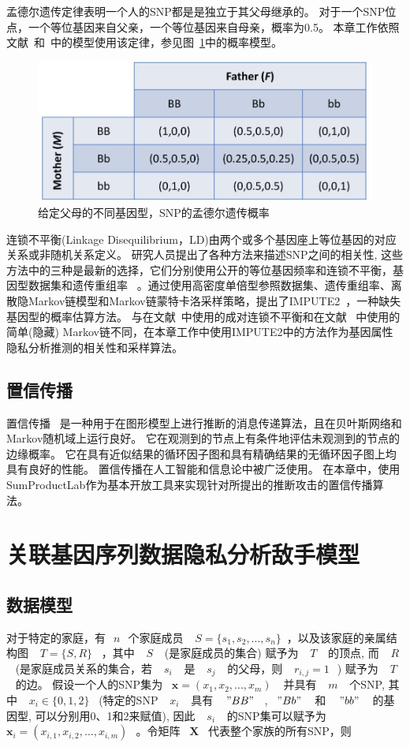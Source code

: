 孟德尔遗传定律表明一个人的SNP都是是独立于其父母继承的。 对于一个SNP位点，一个等位基因来自父亲，一个等位基因来自母亲，概率为0.5。 本章工作依照文献~\cite{humbert2013addressing}和~\cite{deznabi2018inference}中的模型使用该定律，参见图~\ref{fig:Mendelian-law}中的概率模型。

\begin{figure}[htbp]
	\centering
	\includegraphics[width=0.6\linewidth]{./figures/Mendelian-law.jpg}
	\centering
	\caption{给定父母的不同基因型，SNP的孟德尔遗传概率}\label{fig:Mendelian-law}
\end{figure}

连锁不平衡(Linkage Disequilibrium，LD)由两个或多个基因座上等位基因的对应关系或非随机关系定义。 研究人员提出了各种方法来描述SNP之间的相关性, 这些方法中的三种是最新的选择，它们分别使用公开的等位基因频率和连锁不平衡，基因型数据集和遗传重组率~\cite{samani2015quantifying} 。通过使用高密度单倍型参照数据集、遗传重组率、离散隐Markov链模型和Markov链蒙特卡洛采样策略，提出了IMPUTE2~\cite{howie2014impute2}，一种缺失基因型的概率估算方法。 与在文献~\cite{humbert2013addressing,humbert2017quantifying}中使用的成对连锁不平衡和在文献~\cite{deznabi2018inference} 中使用的简单(隐藏) Markov链不同，在本章工作中使用IMPUTE2中的方法作为基因属性隐私分析推测的相关性和采样算法。

\subsection{置信传播}

置信传播~\cite{kschischang2001factor} 是一种用于在图形模型上进行推断的消息传递算法，且在贝叶斯网络和Markov随机域上运行良好。 它在观测到的节点上有条件地评估未观测到的节点的边缘概率。 它在具有近似结果的循环因子图和具有精确结果的无循环因子图上均具有良好的性能。 置信传播在人工智能和信息论中被广泛使用。 在本章中，使用 SumProductLab作为基本开放工具来实现针对所提出的推断攻击的置信传播算法。

\section{关联基因序列数据隐私分析敌手模型}
\subsection{数据模型}
对于特定的家庭，有~$~n~$~个家庭成员 ~$~S=\{s_1,s_2,...,s_n\}$~，以及该家庭的亲属结构图 ~$~T=\{S,R\}$~ ，其中 ~$~S~$~ (是家庭成员的集合) 赋予为 ~$~T~$~ 的顶点, 而 ~$~R~$~ (是家庭成员关系的集合，若 ~$~s_i~$~ 是 ~$~s_j~$~ 的父母，则 ~$~r_{i,j}=1~$~) 赋予为 ~$~T~$~ 的边。 假设一个人的SNP集为 ~$\mathbf{x}=(x_1,x_2,...,x_m)~$~ 并具有 ~$~m~$~ 个SNP, 其中 ~$~x_i \in \{0,1,2\}$~ (特定的SNP ~$~x_i~$~ 具有 ~$~"BB"~$~,~$~"Bb"~$~ 和 ~$~"bb"~$~ 的基因型, 可以分别用0、1和2来赋值), 因此 ~$~s_i~$~ 的SNP集可以赋予为 ~$\mathbf{x}_i=(x_{i,1},x_{i,2},...,x_{i,m})~$~。令矩阵 ~$\mathbf{X}$~ 代表整个家族的所有SNP，则

